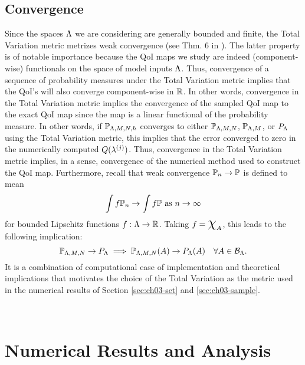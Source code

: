 \subsection{Convergence}
Since the spaces ${\Lambda}$ we are considering are generally bounded and finite, the Total Variation metric metrizes weak convergence (see Thm. 6 in \cite{GS02}).
The latter property is of notable importance because the QoI maps we study are indeed (component-wise) functionals on the space of model inputs ${\Lambda}$.
Thus, convergence of a sequence of probability measures under the Total Variation metric implies that the QoI's will also converge component-wise in $\mathbb{R}$.
In other words, convergence in the Total Variation metric implies the convergence of the sampled QoI map to the exact QoI map since the map is a linear functional of the probability measure.
In other words, if $\mathbb{P}_{{\Lambda},M,N,h}$ converges to either $\mathbb{P}_{{\Lambda},M,N}$, $\mathbb{P}_{{\Lambda},M}$, or $P_{\Lambda}$ using the Total Variation metric, this implies that the error converged to zero in the numerically computed $Q(\lambda^{(j)})$.
Thus, convergence in the Total Variation metric implies, in a sense, convergence of the numerical method used to construct the QoI map.
Furthermore, recall that weak convergence $\mathbb{P}_n \to \mathbb{P}$ is defined to mean
\[
\int f \mathbb{P}_n \to \int f \mathbb{P} \text{ as } n \to \infty
\]
for bounded Lipschitz functions $f:{\Lambda}\to\mathbb{R}$.
Taking $f = \Chi_A$, this leads to the following implication:
\[
\mathbb{P}_{{\Lambda}, M, N} \to P_{\Lambda} \implies \mathbb{P}_{{\Lambda}, M, N} (A) \to P_{\Lambda} (A) \quad \forall{A\in\mathcal{B}_{{\Lambda}}}.
\]
It is a combination of computational ease of implementation and theoretical implications that motivates the choice of the Total Variation as the metric used in the numerical results of Section \ref{sec:ch03-set} and \ref{sec:ch03-sample}.



% 


\
\section{Numerical Results and Analysis}\label{sec:ch03-examples}


